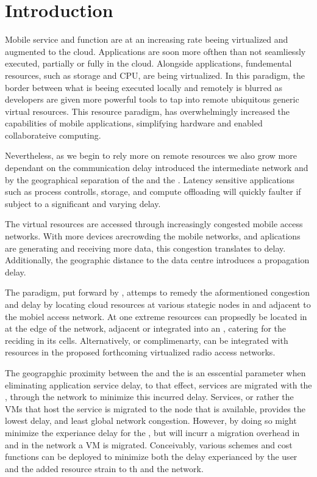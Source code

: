\section{Introduction}
Mobile service and function are at an increasing rate beeing virtualized and augmented to the cloud. Applications are soon more ofthen than not seamliessly executed, partially or fully in the cloud. Alongside applications, fundemental \ue resources, such as storage and CPU, are being virtualized. In this paradigm, the border between what is beeing executed locally and remotely is blurred as developers are given more powerful tools to tap into remote ubiquitous generic virtual resources. This resource paradigm, has overwhelmingly increased the capabilities of mobile applications, simplifying hardware and enabled collaborateive computing. 

Nevertheless, as we begin to rely more on remote resources we also grow more dependant on the communication delay introduced the intermediate network and by the geographical separation of the \ue and the \dc. Latency sensitive applications such as process controlls, storage, and compute offloading will quickly faulter if subject to a significant and varying delay.

The virtual resources are accessed through increasingly congested mobile access networks. With more devices arecrowding the mobile networks, and aplications are generating and receiving more data, this congestion translates to delay. Additionally, the geographic distance to the data centre introduces a propagation delay.

The \xcloud paradigm, put forward by \cite{chandra2013decentralized,ericsson_akami}, attemps to remedy the aformentioned congestion and delay by locating cloud resources at various stategic nodes in and adjacent to the mobiel access network. At one extreme \dc resources can propsedly be located in at the edge of the network, adjacent or integrated into an \rbs, catering for the \ues reciding in its cells. Alternatively, or complimenarty, \dcs can be integrated with resources in the proposed forthcoming virtualized radio access networks.

The geograpghic proximity between the \ue and the \dc is an esscential parameter when eliminating application service delay, to that effect, services are migrated with the \ue, through the network to minimize this incurred delay. Services, or rather the VMs that host the service is migrated to the node that is available, provides the lowest delay, and least global network congestion. However, by doing so might minimize the experiance delay for the \ue, but will incurr a migration overhead in \dc and in the network a VM is migrated. Conceivably, various schemes and cost functions can be deployed to minimize both the delay experianced by the user and the added resource strain to th \dc and the network.

